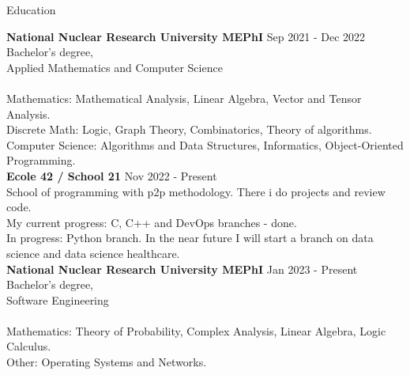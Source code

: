 \documentclass{resume} %
\begin{document}
\begin{rSection}{Education}

{\bf National Nuclear Research University MEPhI} \hfill { Sep 2021 - Dec 2022}
\\ 
Bachelor's degree,\\ Applied Mathematics and Computer Science\\ \\ 
Mathematics: Mathematical Analysis, Linear Algebra, Vector and Tensor Analysis. \\ 
Discrete Math: Logic, Graph Theory, Combinatorics, Theory of algorithms. \\
Computer Science: Algorithms and Data Structures, Informatics, Object-Oriented Programming. \\

{\bf Ecole 42 / School 21} \hfill { Nov 2022 - Present} \\ 
School of programming with p2p methodology. There i do projects and review code. \\ 
My current progress: C, C++ and DevOps branches - done. \\
In progress: Python branch.
In the near future I will start a branch on data science and data science healthcare. \\

{\bf National Nuclear Research University MEPhI} \hfill { Jan 2023 - Present}
\\ 
Bachelor's degree,\\ Software Engineering\\ \\ 
Mathematics: Theory of Probability, Complex Analysis, Linear Algebra, Logic Calculus. \\
Other: Operating Systems and Networks. \\







\end{rSection}
\end{document}
